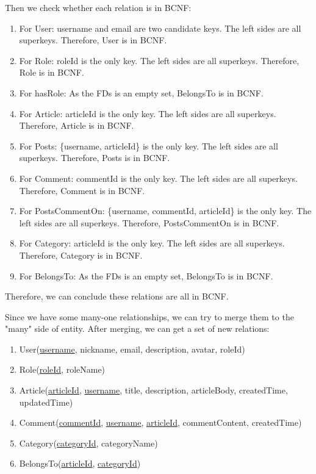 \documentclass[11pt]{homework}
\begin{document}
  Then we check whether each relation is in BCNF:
  \begin{enumerate}
    \item For User: username and email are two candidate keys. The left sides are all superkeys. Therefore, User is in BCNF.
    \item For Role: roleId is the only key. The left sides are all superkeys. Therefore, Role is in BCNF.
    \item For hasRole: As the FDs is an empty set, BelongsTo is in BCNF.
    \item For Article: articleId is the only key. The left sides are all superkeys. Therefore, Article is in BCNF.
    \item For Posts: \{username, articleId\} is the only key. The left sides are all superkeys. Therefore, Posts is in BCNF.
    \item For Comment: commentId is the only key. The left sides are all superkeys. Therefore, Comment is in BCNF.
    \item For PostsCommentOn: \{username, commentId, articleId\} is the only key. The left sides are all superkeys. Therefore, PostsCommentOn is in BCNF.
    \item For Category: articleId is the only key. The left sides are all superkeys. Therefore, Category is in BCNF.
    \item For BelongsTo: As the FDs is an empty set, BelongsTo is in BCNF.
  \end{enumerate}

  Therefore, we can conclude these relations are all in BCNF.

  Since we have some many-one relationships, we can try to merge them to the "many" side of entity. After merging, we can get
  a set of new relations:
  \begin{enumerate}
    \item User(\underline{username}, nickname, email, description, avatar, roleId)
    \item Role(\underline{roleId}, roleName)
    \item Article(\underline{articleId}, \underline{username}, title, description, articleBody, createdTime, updatedTime)
    \item Comment(\underline{commentId}, \underline{username}, \underline{articleId}, commentContent, createdTime)
    \item Category(\underline{categoryId}, categoryName)
    \item BelongsTo(\underline{articleId}, \underline{categoryId})
  \end{enumerate}
  
\end{document}
